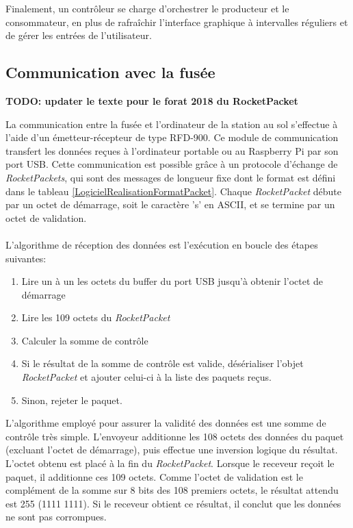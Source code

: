 Finalement, un contrôleur se charge d'orchestrer le producteur et le consommateur, en plus de rafraîchir l'interface graphique à intervalles réguliers et de gérer les entrées de l'utilisateur.

\subsection{Communication avec la fusée}
\label{s:rocket_communication}
\textbf{TODO: updater le texte pour le forat 2018 du RocketPacket}

La communication entre la fusée et l'ordinateur de la station au sol s'effectue à l'aide d'un émetteur-récepteur de type RFD-900.
Ce module de communication transfert les données reçues à l'ordinateur portable ou au Raspberry Pi par son port USB.
Cette communication est possible grâce à un protocole d'échange de \emph{RocketPackets}, qui sont des messages de longueur fixe dont le format est défini dans le tableau \ref{LogicielRealisationFormatPacket}.
Chaque \emph{RocketPacket} débute par un octet de démarrage, soit le caractère 's' en ASCII, et se termine par un octet de validation.
\\ \\
L'algorithme de réception des données est l'exécution en boucle des étapes suivantes:

\begin{enumerate}
    \item Lire un à un les octets du buffer du port USB jusqu'à obtenir l'octet de démarrage
    \item Lire les 109 octets du \emph{RocketPacket}
    \item Calculer la somme de contrôle
    \item Si le résultat de la somme de contrôle est valide, désérialiser l'objet \emph{RocketPacket} et ajouter celui-ci à la liste des paquets reçus.
    \item Sinon, rejeter le paquet.
\end{enumerate}

L'algorithme employé pour assurer la validité des données est une somme de contrôle très simple.
L'envoyeur additionne les 108 octets des données du paquet (excluant l'octet de démarrage), puis effectue une inversion logique du résultat.
L'octet obtenu est placé à la fin du \emph{RocketPacket}.
Lorsque le receveur reçoit le paquet, il additionne ces 109 octets.
Comme l'octet de validation est le complément de la somme sur 8 bits des 108 premiers octets, le résultat attendu est 255 (1111 1111).
Si le receveur obtient ce résultat, il conclut que les données ne sont pas corrompues.

